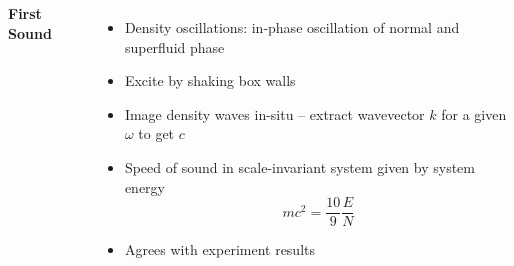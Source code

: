 \documentclass[26pt, paperwidth=36in,paperheight=48in]{tikzposter} %
\newcommand{\myfont}{\fontsize{24}{30}\selectfont}
\begin{document}
\begin{columns} 
	\block[]{\textcolor{BEC1blue}{Density Response -- First Sound [2]}}
	{
	\begin{minipage}{0.2\textwidth}
		\vspace{0.5cm}
		\textbf{First Sound}
		\vspace{1cm}
		\myfont
		\begin{itemize}
			\item Density oscillations: in-phase oscillation of normal and superfluid phase
			
			\item Excite by shaking box walls
			
			\item Image density waves in-situ -- extract wavevector $k$ for a given $\omega$ to get $c$
			
			\item Speed of sound in scale-invariant system given by system energy $$mc^2 = \frac{10}{9} \frac{E}{N}$$
			
			\item Agrees with experiment results
		\end{itemize}
		

\end{minipage}}
\end{columns}
\end{document}
